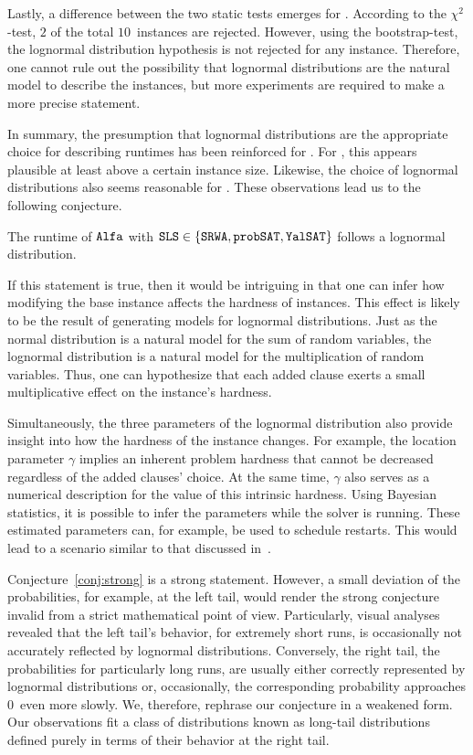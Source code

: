 Lastly, a difference between the two static tests emerges for \YAL{}. According to the $\chi^2$-test, $2$ of the total $10$~instances are rejected. However, using the bootstrap-test, the lognormal distribution hypothesis is not rejected for any instance. Therefore, one cannot rule out the possibility that lognormal distributions are the natural model to describe the instances, but more experiments are required to make a more precise statement.

In summary, the presumption that lognormal distributions are the appropriate choice for describing runtimes has been reinforced for \SRWA{}. For \probSAT{}, this appears plausible at least above a certain instance size. Likewise, the choice of lognormal distributions also seems reasonable for \YAL{}. These observations lead us to the following conjecture.

\begin{conjecture}
	\label{conj:strong}
	The runtime of $\texttt{Alfa}$ with $\texttt{SLS} \in \{ \texttt{SRWA}, \texttt{probSAT}, \texttt{YalSAT} \}$ follows a lognormal distribution.
\end{conjecture}

If this statement is true, then it would be intriguing in that one can infer how modifying the base instance affects the hardness of instances.
This effect is likely to be the result of generating models for lognormal distributions.
Just as the normal distribution is a natural model for the sum of \iid random variables, the lognormal distribution is a natural model for the multiplication of \iid random variables. Thus, one can hypothesize that each added clause exerts a small multiplicative effect on the instance's hardness. 

Simultaneously, the three parameters of the lognormal distribution also provide insight into how the hardness of the instance changes. For example, the location parameter $\gamma$ implies an inherent problem hardness that cannot be decreased regardless of the added clauses' choice. 
At the same time, $\gamma$ also serves as a numerical description for the value of this intrinsic hardness.
Using Bayesian statistics, it is possible to infer the parameters while the solver is running.
These estimated parameters can, for example, be used to schedule restarts.
This would lead to a scenario similar to that discussed in~\cite{RHK02RestartPolicies}.

Conjecture~\ref{conj:strong} is a strong statement.
However, %
a small deviation of the probabilities, for example, at the left tail, would render the strong conjecture invalid from a 
strict
mathematical point of view. Particularly, 
visual analyses revealed that the left tail's behavior, \ie for extremely short runs, is occasionally not accurately reflected by lognormal distributions. Conversely, the right tail, \ie the probabilities for particularly long runs, are usually either correctly represented by lognormal distributions or, occasionally, the corresponding probability approaches $0$~even more slowly. We, therefore, rephrase our conjecture in a %
weakened form. Our observations fit a class of distributions known as long-tail distributions defined purely in terms of their behavior at the right tail.


